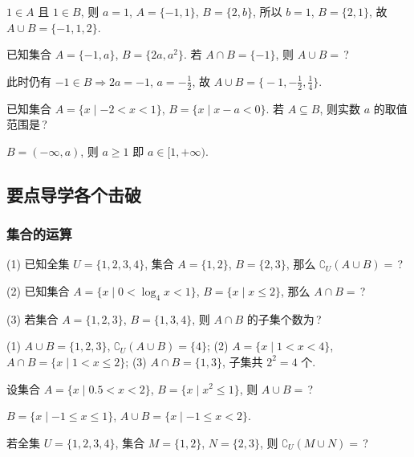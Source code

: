 \beginsolution
  \(1\in A\) 且 \(1\in B\), 则 \(a=1\), $A=\{-1,1\}$, $B=\{2,b\}$, 
  所以 $b=1$, $B=\{2,1\}$, 故 $A\cup B=\{-1,1,2\}$.
  
  \varexercise 已知集合 $A=\{-1,a\}$, $B=\{2a,a^2\}$. 
  若 $A\cap B=\{-1\}$, 则 $A\cup B=$\,?
  
  此时仍有 $-1\in B\Rightarrow 2a=-1$, $a=-\frac12$, 
  故 $A\cup B=\Big\{-1,-\frac12,\frac14\Big\}$.
\endsolution

\begin{exercise}
  已知集合 $A=\{x\mid -2<x<1\}$, $B=\{x\mid x-a<0\}$. 若 $A\subseteq B$, 
  则实数 $a$ 的取值范围是\,?
\end{exercise}

\beginsolution
  $B=(-\infty,a)$, 则 $a\geqslant 1$ 即 $a\in [1,+\infty)$.
\endsolution

\subsection{要点导学\quad 各个击破}
\subsubsection{集合的运算}
\begin{example}
  (1)  已知全集 $U=\{1,2,3,4\}$, 集合 $A=\{1,2\}$, $B=\{2,3\}$, 
  那么 $\complement_U (A\cup B)=$\,?

  (2) 已知集合 $A=\{x\mid 0< \log_4 x< 1\}$, $B=\{x\mid x\leqslant 2\}$, 
  那么 $A\cap B=$\,?

  (3) 若集合 $A=\{1,2,3\}$, $B=\{1,3,4\}$, 则 $A\cap B$ 的子集个数为\,?
\end{example}

\beginsolution
  (1) $A\cup B=\{1,2,3\}$, $\complement_U (A\cup B)=\{4\}$;
  (2) $A=\{x\mid 1<x<4\}$, $A\cap B=\{x\mid 1<x\leqslant 2\}$;
  (3) $A\cap B= \{1,3\}$, 子集共 $2^2=4$ 个.
\endsolution

\lianxi
\begin{exercise}
  设集合 $A=\{x\mid  0.5<x<2\}$, $B=\{x\mid x^2\leqslant 1\}$, 则 $A\cup B=$\,?
\end{exercise}

\beginsolution
  $B=\{x\mid -1\leqslant x\leqslant 1\}$, $A\cup B=\{x\mid -1\leqslant x<2\}$.
\endsolution

\begin{exercise}
  若全集 $U=\{1,2,3,4\}$, 集合 $M=\{1,2\}$, $N=\{2,3\}$, 
  则 $\complement_U (M\cup N)=$\,?
\end{exercise}

